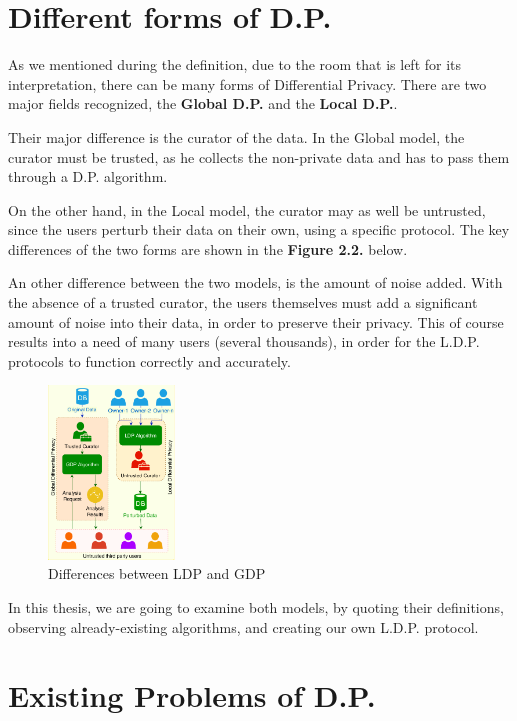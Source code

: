 \section{Different forms of D.P.}

As we mentioned during the definition, due to the room that is left for its interpretation, there can be many forms of Differential Privacy. There are two major fields recognized, the \textbf{Global D.P.} and the \textbf{Local D.P.}.

Their major difference is the curator of the data. In the Global model, the curator must be trusted, as he collects the non-private data and has to pass them through a D.P. algorithm.

On the other hand, in the Local model, the curator may as well be untrusted, since the users perturb their data on their own, using a specific protocol. The key differences of the two forms are shown in the \textbf{Figure 2.2.} below.

An other difference between the two models, is the amount of noise added. With the absence of a trusted curator, the users themselves must add a significant amount of noise into their data, in order to preserve their privacy. This of course results into a need of many users (several thousands), in order for the L.D.P. protocols to function correctly and accurately.


\begin{figure}[!htb]\centering
      \includegraphics[width=0.3\textwidth]{images/local_vs_global.png}
  \caption{Differences between LDP and GDP}
\end{figure}

In this thesis, we are going to examine both models, by quoting their definitions, observing already-existing algorithms, and creating our own L.D.P. protocol.

\section{Existing Problems of D.P.}

